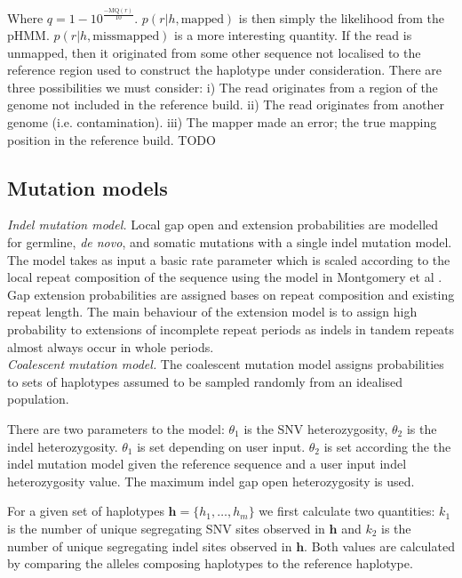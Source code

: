 \documentclass[notitlepage, twocolumn]{article}
\begin{document}
Where $q = 1 - 10^{\frac{-\text{MQ}(r)}{10}}$. $p(r | h, \text{mapped})$ is then simply the likelihood from the pHMM. $p(r | h, \text{missmapped})$ is a more interesting quantity. If the read is unmapped, then it originated from some other sequence not localised to the reference region used to construct the haplotype under consideration. There are three possibilities we must consider: i) The read originates from a region of the genome not included in the reference build. ii) The read originates from another genome (i.e. contamination). iii) The mapper made an error; the true mapping position in the reference build. TODO

\subsection*{Mutation models}

\emph{Indel mutation model.} Local gap open and extension probabilities are modelled for germline, \textit{de novo}, and somatic mutations with a single indel mutation model. The model takes as input a basic rate parameter which is scaled according to the local repeat composition of the sequence using the model in Montgomery et al \cite{RN577}. Gap extension probabilities are assigned bases on repeat composition and existing repeat length. The main behaviour of the extension model is to assign high probability to extensions of incomplete repeat periods as indels in tandem repeats almost always occur in whole periods.\\

\emph{Coalescent mutation model.} The coalescent mutation model assigns probabilities to sets of haplotypes assumed to be sampled randomly from an idealised population.

There are two parameters to the model: $\theta_1$ is the SNV heterozygosity, $\theta_2$ is the indel heterozygosity. $\theta_1$ is set depending on user input. $\theta_2$ is set according the the indel mutation model given the reference sequence and a user input indel heterozygosity value. The maximum indel gap open heterozygosity is used.

For a given set of haplotypes ${\boldsymbol{h} = \{h_1, \dots, h_m\}}$ we first calculate two quantities: $k_1$ is the number of unique segregating SNV sites observed in $\boldsymbol{h}$ and $k_2$ is the number of unique segregating indel sites observed in $\boldsymbol{h}$. Both values are calculated by comparing the alleles composing haplotypes to the reference haplotype. 
\end{document}

